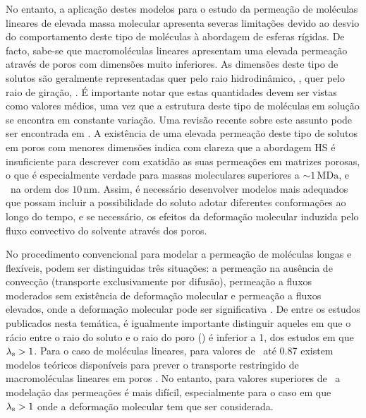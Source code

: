 No entanto, a aplicação destes modelos para o estudo da permeação de moléculas lineares de elevada massa molecular apresenta severas limitações devido ao desvio do comportamento deste tipo de moléculas à abordagem de esferas rígidas. De facto, sabe-se que macromoléculas lineares apresentam uma elevada permeação através de poros com dimensões muito inferiores. As dimensões deste tipo de solutos são geralmente representadas quer pelo raio hidrodinâmico, \raiostokes, quer pelo raio de giração, \raiogiracao. É importante notar que estas quantidades devem ser vistas como valores médios, uma vez que a estrutura deste tipo de moléculas em solução se encontra em constante variação. Uma revisão recente sobre este assunto pode ser encontrada em \cite{latu07}. A existência de uma elevada permeação deste tipo de solutos em poros com menores dimensões indica com clareza que a abordagem HS é insuficiente para descrever com exatidão as suas permeações em matrizes porosas, o que é especialmente verdade para massas moleculares superiores a $\sim 1\,\mathrm{MDa}$, e \raiogiracao\ na ordem dos $10\,\mathrm{nm}$. Assim, é necessário desenvolver modelos mais adequados que possam incluir a possibilidade do soluto adotar diferentes conformações ao longo do tempo, e se necessário, os efeitos da deformação molecular induzida pelo fluxo convectivo do solvente através dos poros.

No procedimento convencional para modelar a permeação de moléculas longas e flexíveis, podem ser distinguidas três situações: a permeação na ausência de convecção (transporte exclusivamente por difusão), permeação a fluxos moderados sem existência de deformação molecular e permeação a fluxos elevados, onde a deformação molecular pode ser significativa \cite{deen}. De entre os estudos publicados nesta temática, é igualmente importante distinguir aqueles em que o rácio entre o raio do soluto e o raio do poro (\lambdas) é inferior a 1, dos estudos em que $\lambda_{\mathrm{s}}>1$. Para o caso de moléculas lineares, para valores de \lambdas\ até 0.87 existem modelos teóricos disponíveis para prever o transporte restringido de macromoléculas lineares em poros \cite{davidson88}. No entanto, para valores superiores de \lambdas\ a modelação das permeações é mais difícil, especialmente para o caso em que $\lambda_{\mathrm{s}}>1$ onde a deformação molecular tem que ser considerada.

